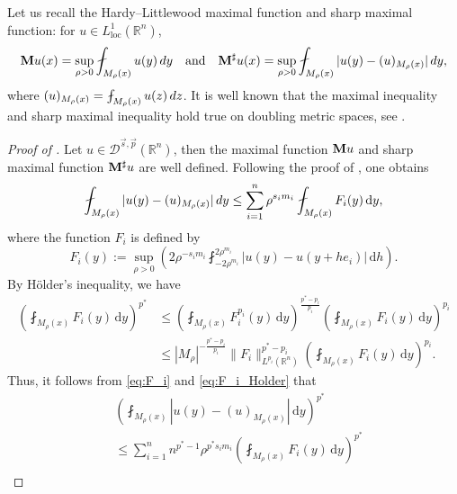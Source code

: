 \documentclass[11pt]{amsart}
\theoremstyle{plain}
\theoremstyle{definition}
\numberwithin{equation}{section}
\renewcommand{\d}{\textnormal{d}}
\begin{document}
Let us recall the Hardy–Littlewood maximal function and sharp maximal function: for $u \in L^1_{\mathrm{loc}}(\mathbb{R}^n)$,
\begin{equation*}
{\bf M}u(x) = \sup_{\rho > 0} \fint_{M_\rho(x)} u(y) \,\d y \quad\text{and}\quad {\bf M}^{\sharp}u(x) = \sup_{\rho>0} \fint_{M_\rho(x)} |u(y) - (u)_{M_\rho(x)}| \,\d y,
\end{equation*}
where $(u)_{M_{\rho}(x)} = \fint_{M_{\rho}(x)} u(z)\,\d z$. It is well known that the maximal inequality and sharp maximal inequality hold true on doubling metric spaces, see \cite{Hein01,GrafakosMF,CK}.

\begin{proof} [Proof of ]
Let $u \in \mathcal{D}^{\vec{s},\vec{p}}(\mathbb{R}^n)$, then the maximal function ${\bf M}u$ and sharp maximal function ${\bf M}^{\sharp}u$ are well defined. Following the proof of \cite[Theorem 2.4]{CK}, one obtains
\begin{equation} \label{eq:F_i}
\fint_{M_\rho(x)} |u(y) - (u)_{M_\rho(x)}|\, \d y \leq \sum_{i=1}^n \rho^{s_i m_i} \fint_{M_{\rho}(x)} F_i(y) \,\mathrm{d}y,
\end{equation}
where the function $F_i$ is defined by
\begin{equation*}
F_i(y) := \sup_{\rho > 0} \left( 2\rho^{-s_im_i} \fint_{-2\rho^{m_i}}^{2\rho^{m_i}} |u(y) - u(y+he_i)| \,\mathrm{d}h \right).
\end{equation*}
By H\"older's inequality, we have
\begin{equation} \label{eq:F_i_Holder}
\begin{split}
\left( \fint_{M_\rho(x)} F_i(y) \,\mathrm{d}y \right)^{p^{\ast}} 
&\leq \left( \fint_{M_{\rho}(x)} F_i^{p_i}(y) \,\mathrm{d}y \right)^{\frac{{p^{\ast}}-p_i}{p_i}} \left( \fint_{M_{\rho}(x)} F_i(y) \,\mathrm{d}y \right)^{p_i} \\
&\leq |M_{\rho}|^{-\frac{{p^{\ast}}-p_i}{p_i}} \|F_i\|_{L^{p_i}(\mathbb{R}^n)}^{{p^{\ast}}-p_i} \left( \fint_{M_{\rho}(x)} F_i(y) \,\mathrm{d}y \right)^{p_i}.
\end{split}
\end{equation}
Thus, it follows from \eqref{eq:F_i} and \eqref{eq:F_i_Holder} that
\begin{equation*}
\begin{split}
&\left( \fint_{M_\rho(x)} |u(y) - (u)_{M_\rho(x)}|\,\mathrm{d}y \right)^{p^{\ast}} \\
&\leq \sum_{i=1}^n n^{{p^{\ast}}-1} \rho^{{p^{\ast}}s_im_i} \left( \fint_{M_{\rho}(x)} F_i(y) \,\mathrm{d}y \right)^{p^{\ast}} \\

\end{split}
\end{equation*}
\end{proof}
\end{document}
